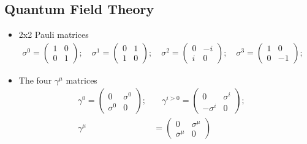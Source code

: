 \subsection{Quantum Field Theory}
\begin{itemize}
    \item 2x2 Pauli matrices \cite{wells}
        \begin{equation}
        \begin{split}
        \sigma^0=\begin{pmatrix}1&0\\0&1\end{pmatrix} ;\quad
        \sigma^1=\begin{pmatrix}0&1\\1&0\end{pmatrix} ;\quad
        \sigma^2=\begin{pmatrix}0&-i\\i&0\end{pmatrix} ;\quad
        \sigma^3=\begin{pmatrix}1&0\\0&-1\end{pmatrix} ;\quad
        \end{split}
        \end{equation}
    \item The four $\gamma^\mu$ matrices  \cite{wells}
        \begin{equation}
        \begin{split}
        \gamma^0=\begin{pmatrix}0&\sigma^0\\\sigma^0&0\end{pmatrix} ;&\quad
        \gamma^{i>0}=\begin{pmatrix}0&\sigma^i\\-\sigma^i&0\end{pmatrix} ;\quad \\
        \gamma^\mu &= \begin{pmatrix}0&\sigma^\mu\\\overline{\sigma}^\mu&0\end{pmatrix}
        \end{split}
        \end{equation}
\end{itemize}

